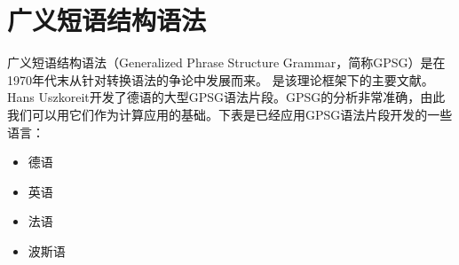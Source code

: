 
\chapter{广义短语结构语法}
\label{Kapitel-GPSG}

广义短语结构语法（Generalized Phrase Structure Grammar，简称GPSG）是在1970年代末从针对转换语法的争论中发展而来。 \citet*{GKPS85a}是该理论框架下的主要文献。Hans Uszkoreit\citeyearpar{Uszkoreit87a}开发了德语的大型GPSG语法片段。GPSG的分析非常准确，由此我们可以用它们作为计算应用的基础。下表是已经应用GPSG语法片段开发的一些语言：
\begin{itemize}
\item 德语 \citep{Weisweber87a-u,WP92b,Naumann87a-u,Naumann88-u-gekauft,Volk88}
\item 英语 \citep*{Evans85a-u,PT85a-u,Phillips92a-u,GCB93a-u}
\item 法语 \citep*{EdSB96a}
\item 波斯语 \citep*{BSM2011a}
\end{itemize}

